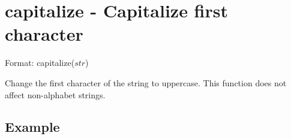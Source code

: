 
%

\section{capitalize - Capitalize first character\label{sect:capitalize}}

Format: capitalize($str$)

Change the first character of the string to uppercase. 
This function does not affect non-alphabet strings. 


\subsection*{Example}


%

